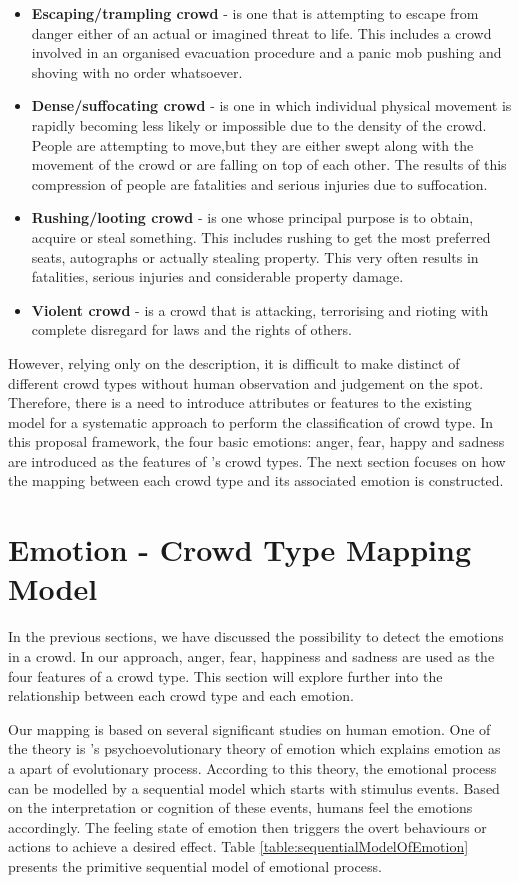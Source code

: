 \begin{itemize}
\item \textbf{Escaping/trampling crowd} - is one that is attempting to escape from danger either of an actual or imagined threat to life. This includes a crowd involved in an organised evacuation procedure and a panic mob pushing and shoving with no order whatsoever.
\item \textbf{Dense/suffocating crowd} - is one in which individual physical movement is rapidly becoming less likely or impossible due to the density of the crowd. People are attempting to move,but they are either swept along with the movement of the crowd or are falling on top of each other. The results of this compression of people are fatalities and serious injuries due to suffocation.
\item \textbf{Rushing/looting crowd} - is one whose principal purpose is to obtain, acquire or steal something. This includes rushing to get the most preferred seats, autographs or actually stealing property. This very often results in fatalities, serious injuries and considerable property damage.
\item \textbf{Violent crowd} - is a crowd that is attacking, terrorising and rioting with complete disregard for laws and the rights of others.
\end{itemize}
However, relying only on the description, it is difficult to make distinct of different crowd types without human observation and judgement on the spot. Therefore, there is a need to introduce attributes or features to the existing model for a systematic approach to perform the classification of crowd type. In this proposal framework, the four basic emotions: anger, fear, happy and sadness are introduced as the features of \citet{Berlonghi1995}'s crowd types. The next section focuses on how the mapping between each crowd type and its associated emotion is constructed.

\section{Emotion - Crowd Type Mapping Model}
In the previous sections, we have discussed the possibility to detect the emotions in a crowd. In our approach, anger, fear, happiness and sadness are used as the four features of a crowd type. This section will explore further into the relationship between each crowd type and each emotion. 

Our mapping is based on several significant studies on human emotion. One of the theory is \citet{Plutchik1980}'s psychoevolutionary theory of emotion which explains emotion as a apart of evolutionary process. According to this theory, the emotional process can be modelled by a sequential model which starts with stimulus events. Based on the interpretation or cognition of these events, humans feel the emotions accordingly. The feeling state of emotion then triggers the overt behaviours or actions to achieve a desired effect. Table \ref{table:sequentialModelOfEmotion} presents the primitive sequential model of emotional process.

